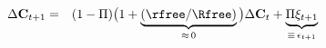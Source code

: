\begin{eqnarray}
    \Delta \mathbf{C}_{t+1} & = & (1-\Pi)\big(1+\underbrace{(\rfree/\Rfree)}_{\approx\,0}\big) \Delta \mathbf{C}_{t} + \underbrace{\Pi \xi_{t+1}}_{\equiv\,\epsilon_{t+1}} \label{eq:dCQuadSticky}
\end{eqnarray}
